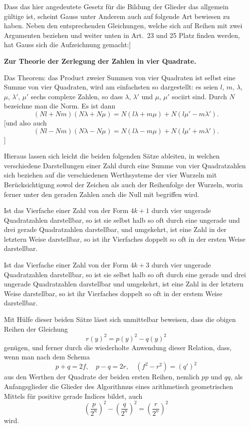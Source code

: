 \documentclass[12pt,a4paper]{article}
\begin{document}
Dass das hier angedeutete Gesetz f\"ur die Bildung der Glieder das allgemein g\"ultige ist, scheint Gauss unter Anderem auch auf folgende Art bewiesen zu haben. Neben den entsprechenden Gleichungen, welche sich auf Reihen mit zwei Argumenten beziehen und weiter unten in Art.\ 23 und 25 Platz finden werden, hat Gauss sich die Aufzeichnung gemacht:]

\textbf{Zur Theorie der Zerlegung der Zahlen in vier Quadrate.}

Das Theorem: das Product zweier Summen von vier Quadraten ist selbst eine Summe von vier Quadraten, wird am einfachsten so dargestellt:
es seien $l$, $m$, $\lambda$, $\mu$, $\lambda'$, $\mu'$ sechs complexe Zahlen, so dass $\lambda$, $\lambda'$ und $\mu$, $\mu'$ sociirt sind.
Durch $N$ bezeichne man die Norm. Es ist dann
\[
(Nl + Nm)(N\lambda + N\mu) = N(l\lambda + m\mu) + N(l\mu' - m\lambda').
\]
[und also auch
\[
(Nl - Nm)(N\lambda - N\mu) = N(l\lambda - m\mu) + N(l\mu' + m\lambda').
\]]

Hieraus lassen sich leicht die beiden folgenden S\"atze ableiten, in welchen verschiedene Darstellungen einer Zahl durch eine Summe von vier Quadratzahlen sich beziehen auf die verschiedenen Werthsysteme der vier Wurzeln mit Ber\"ucksichtigung sowol der Zeichen als auch der Reihenfolge der Wurzeln, worin ferner unter den geraden Zahlen auch die Null mit begriffen wird.

Ist das Vierfache einer Zahl von der Form $4k+1$ durch vier ungerade Quadratzahlen darstellbar, so ist sie selbst halb so oft durch eine ungerade und drei gerade Quadratzahlen darstellbar, und umgekehrt, ist eine Zahl in der letztern Weise darstellbar, so ist ihr Vierfaches doppelt so oft in der ersten Weise darstellbar.

Ist das Vierfache einer Zahl von der Form $4k+3$ durch vier ungerade Quadratzahlen darstellbar, so ist sie selbst halb so oft durch eine gerade und drei ungerade Quadratzahlen darstellbar und umgekehrt, ist eine Zahl in der letztern Weise darstellbar, so ist ihr Vierfaches doppelt so oft in der erstem Weise darstellbar.

Mit H\"ulfe dieser beiden S\"atze l\"asst sich unmittelbar beweisen, dass die obigen Reihen der Gleichung
\[
r(y)^2 = p(y)^2 - q(y)^2
\]
gen\"ugen, und ferner durch die wiederholte Anwendung dieser Relation, dass, wenn man nach dem Schema
\[
p + q = 2f, \quad p - q = 2r, \quad (f^2 - r^2) = (q')^2
\]
aus den Werthen der Quadrate der beiden ersten Reihen, nemlich $pp$ und $qq$, als Anfangsglieder die Glieder des Algorithmus eines arithmetisch geometrischen Mittels f\"ur positive gerade Indices bildet, auch
\[
\left(\frac{p}{2^n}\right)^2 - \left(\frac{q}{2^n}\right)^2 = \left(\frac{r}{2^n}\right)^2
\]
wird.
\end{document}
